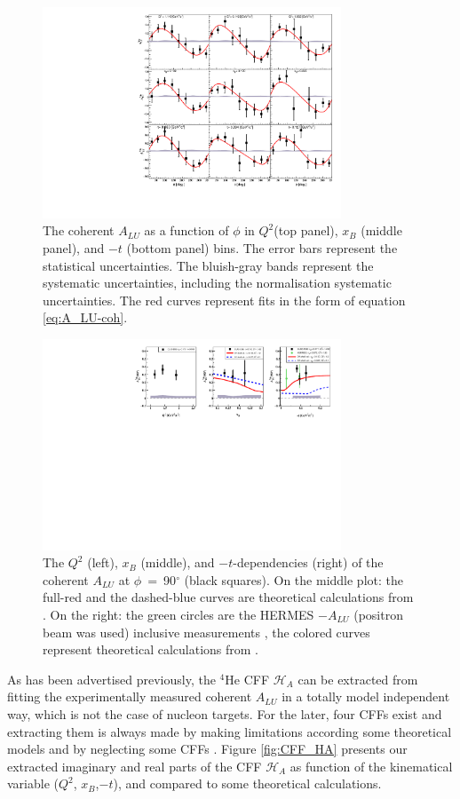 \documentclass[nofootinbib,twocolumn,showpacs,prl,superscriptaddress,secnumarabic,amssymb,nobibnotes,aps,floatfix]{revtex4}
\begin{document}
\begin{figure}[tb]
\includegraphics[width=8.9cm]{figs/coherent-ALU.pdf}
\caption{The coherent $A_{LU}$ as a function of $\phi$ in
   $Q^{2}$(top panel), $x_{B}$ (middle panel), and $-t$ (bottom panel) bins.  
   The error bars represent the statistical uncertainties. The bluish-gray 
   bands represent the systematic uncertainties, including the normalisation 
systematic uncertainties. The red curves represent fits in the form of equation 
\ref{eq:A_LU-coh}.}
\label{fig:alu}
\end{figure}

\begin{figure}[tb]
\includegraphics[width=8.9cm]{figs/coherent-ALU_90.pdf}
\caption{The $Q^{2}$ (left), $x_{B}$ (middle), and $-t$-dependencies (right) of
   the coherent $A_{LU}$ at $\phi$~=~90$^{\circ}$ (black squares). On the 
   middle plot: the full-red and the dashed-blue curves are theoretical 
   calculations from \cite{simonetta_2}. On the right: the green circles are 
   the HERMES $-A_{LU}$ (positron beam was used) inclusive measurements 
   \cite{HERMES_BSA}, the colored curves represent theoretical calculations 
from \cite{simonetta_2}.}
\label{fig:alu90}
\end{figure}

As has been advertised previously, the $^4$He CFF $\mathcal{H}_A$ can be 
extracted from fitting the experimentally measured coherent $A_{LU}$ in a 
totally model independent way, which is not the case of nucleon targets. For 
the later, four CFFs exist and extracting them is always made by making 
limitations according some theoretical models and by neglecting some CFFs 
\cite{Jo:2015ema}. Figure \ref{fig:CFF_HA} presents our extracted imaginary and 
real parts of the CFF $\mathcal{H}_A$ as function of the kinematical variable 
($Q^{2}$, $x_B$,$-t$), and compared to some theoretical calculations.
\end{document}
